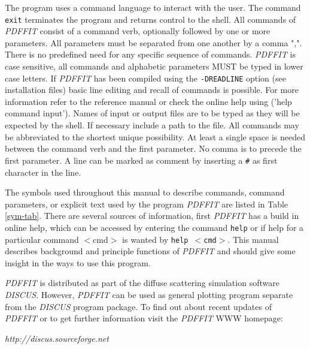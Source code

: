 The program uses a command language to interact with the user.  The
command {\tt exit} terminates the program and returns control to the
shell.  All commands of {\it PDFFIT} consist of a command verb,
optionally followed by one or more parameters.  All parameters must
be separated from one another by a comma ",".  There is no
predefined need for any specific sequence of commands.  {\it PDFFIT}
is case sensitive, all commands and alphabetic parameters MUST be
typed in lower case letters.  If {\it PDFFIT} has been compiled
using the {\tt -DREADLINE} option (see installation files) basic
line editing and recall of commands is possible.  For more
information refer to the reference manual or check the online help
using ('help command input').  Names of input or output files are to
be typed as they will be expected by the shell.  If necessary
include a path to the file.  All commands may be abbreviated to the
shortest unique possibility. At least a single space is needed
between the command verb and the first parameter.  No comma is to
precede the first parameter. A line can be marked as comment by
inserting a {\tt \#} as first character in the line.\par

The symbols used throughout this manual to describe commands,
command parameters, or explicit text used by the program {\it
PDFFIT} are listed in Table \ref{sym-tab}. There are several sources
of information, first {\it PDFFIT} has a build in online help, which
can be accessed by entering the command {\tt help} or if help for a
particular command $<$cmd$>$ is wanted by {\tt help $<$cmd$>$}. This
manual describes background and principle functions of {\it PDFFIT}
and should give some insight in the ways to use this program. \par

{\it PDFFIT} is distributed as part of the diffuse scattering
simulation software {\it DISCUS}.  However, {\it PDFFIT} can be used
as general plotting program separate from the {\it DISCUS} program
package.  To find out about recent updates of {\it PDFFIT} or to get
further information visit the {\it PDFFIT} WWW homepage:

\begin{center}
  {\it http://discus.sourceforge.net}
\end{center}

